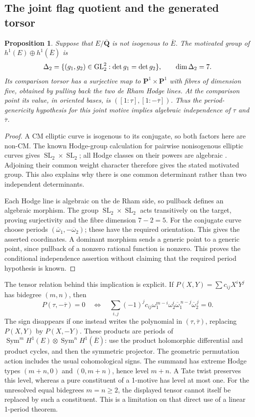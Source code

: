 \documentclass[11pt]{article}
\newtheorem{proposition}[theorem]{Proposition}
\theoremstyle{definition}\newtheorem{definition}[theorem]{Definition}
\theoremstyle{remark}\newtheorem{remark}[theorem]{Remark}
\newcommand{\Qb}{\overline{\mathbf Q}}\newcommand{\Fp}{\mathbf F_p}
\DeclareMathOperator{\SL}{SL}\DeclareMathOperator{\End}{End}
\begin{document}
\subsection{The joint flag quotient and the generated torsor}
\begin{proposition}\label{prop:elliptic-joint-flags}
Suppose that $E/\Qb$ is not isogenous to $\overline E$. The motivated group of $h^1(E)\oplus h^1(\overline E)$ is
\[
 \Delta_2=\{(g_1,g_2)\in\operatorname{GL}_2^2:\det g_1=\det g_2\},\qquad\dim\Delta_2=7.
\]
Its comparison torsor has a surjective map to $\mathbf P^1\times\mathbf P^1$ with fibres of dimension five, obtained by pulling back the two de Rham Hodge lines. At the comparison point its value, in oriented bases, is
$([1:\tau],[1:-\overline\tau])$.
Thus the period-genericity hypothesis for this joint motive implies algebraic independence of $\tau$ and $\overline\tau$.
\end{proposition}
\begin{proof}
A CM elliptic curve is isogenous to its conjugate, so both factors here are non-CM. The known Hodge-group calculation for pairwise nonisogenous elliptic curves gives $\SL_2\times\SL_2$; all Hodge classes on their powers are algebraic \cite[Proposition 5.14, pp.~20--21]{KSV}. Adjoining their common weight character therefore gives the stated motivated group. This also explains why there is one common determinant rather than two independent determinants.

Each Hodge line is algebraic on the de Rham side, so pullback defines an algebraic morphism. The group $\SL_2\times\SL_2$ acts transitively on the target, proving surjectivity and the fibre dimension $7-2=5$. For the conjugate curve choose periods $(\overline\omega_1,-\overline\omega_2)$; these have the required orientation. This gives the asserted coordinates. A dominant morphism sends a generic point to a generic point, since pullback of a nonzero rational function is nonzero. This proves the conditional independence assertion without claiming that the required period hypothesis is known.
\end{proof}

The tensor relation behind this implication is explicit. If
$P(X,Y)=\sum c_{ij}X^iY^j$ has bidegree $(m,n)$, then
\[
 P(\tau,-\overline\tau)=0
 \quad\Longleftrightarrow\quad
 \sum_{i,j}(-1)^jc_{ij}\omega_1^{m-i}\omega_2^i
       \overline\omega_1^{\,n-j}\overline\omega_2^{\,j}=0.
\]
The sign disappears if one instead writes the polynomial in $(\tau,\overline\tau)$, replacing $P(X,Y)$ by $P(X,-Y)$. These products are periods of
$\operatorname{Sym}^m H^1(E)\otimes\operatorname{Sym}^nH^1(\overline E)$: use the product holomorphic differential and product cycles, and then the symmetric projector. The geometric permutation action includes the usual cohomological signs. The summand has extreme Hodge types $(m+n,0)$ and $(0,m+n)$, hence level $m+n$. A Tate twist preserves this level, whereas a pure constituent of a 1-motive has level at most one. For the unresolved equal bidegrees $m=n\ge2$, the displayed tensor cannot itself be replaced by such a constituent. This is a limitation on that direct use of a linear 1-period theorem.
\end{document}
